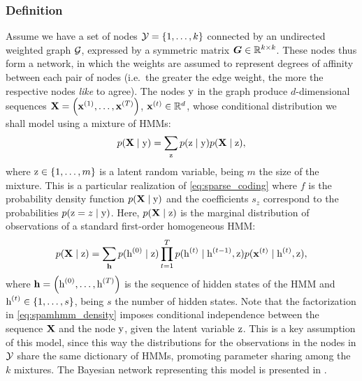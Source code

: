 \subsubsection{Definition}
\label{sec:spamhmm_definition}
Assume we have a set of nodes ${\mathcal{Y}}=\{1, \dots, k\}$ connected by an undirected weighted graph ${\mathcal{G}}$, expressed by a symmetric matrix ${\bm{G}} \in \mathbb{R}^{k \times k}$. These nodes thus form a network, in which the weights are assumed to represent degrees of affinity between each pair of nodes (i.e.\ the greater the edge weight, the more the respective nodes \textit{like} to agree). The nodes ${\textnormal{y}}$ in the graph produce $d$-dimensional sequences ${\mathbf{X}} = \left({\mathbf{x}}^{(1)}, \dots,{\mathbf{x}}^{(T)} \right)$, ${\mathbf{x}}^{(t)} \in \mathbb{R}^d$, whose conditional distribution we shall model using a mixture of HMMs:
\begin{equation}
\label{eq:spamhmm_density}
p({\mathbf{X}} \mid {\textnormal{y}}) = \sum_{{\textnormal{z}}} p({\textnormal{z}}\mid{\textnormal{y}}) p({\mathbf{X}} \mid {\textnormal{z}}),
\end{equation}
where ${\textnormal{z}} \in \{1, \dots, m\}$ is a latent random variable, being $m$ the size of the mixture. This is a particular realization of \eqref{eq:sparse_coding} where $f$ is the probability density function $p({\mathbf{X}} \mid {\textnormal{y}})$ and the coefficients $s_z$ correspond to the probabilities $p({\textnormal{z}} = z \mid {\textnormal{y}})$. Here, $p({\mathbf{X}} \mid {\textnormal{z}})$ is the marginal distribution of observations of a standard first-order homogeneous HMM:
\begin{equation}
\label{eq:spamhmm_hmm}
p({\mathbf{X}} \mid {\textnormal{z}}) = \sum_{{\mathbf{h}}} p({\textnormal{h}}^{(0)}\mid{\textnormal{z}}) \prod_{t=1}^T p({\textnormal{h}}^{(t)}\mid{\textnormal{h}}^{(t-1)},{\textnormal{z}}) p({\mathbf{x}}^{(t)}\mid{\textnormal{h}}^{(t)},{\textnormal{z}}),
\end{equation}
where ${\mathbf{h}} = \left({\textnormal{h}}^{(0)}, \dots,{\textnormal{h}}^{(T)} \right)$ is the sequence of hidden states of the HMM and ${\textnormal{h}}^{(t)} \in \{1, \dots, s\}$, being $s$ the number of hidden states. Note that the factorization in \eqref{eq:spamhmm_density} imposes conditional independence between the sequence ${\mathbf{X}}$ and the node ${\textnormal{y}}$, given the latent variable ${\textnormal{z}}$. This is a key assumption of this model, since this way the distributions for the observations in the nodes in ${\mathcal{Y}}$ share the same dictionary of HMMs, promoting parameter sharing among the $k$ mixtures. The Bayesian network representing this model is presented in .


